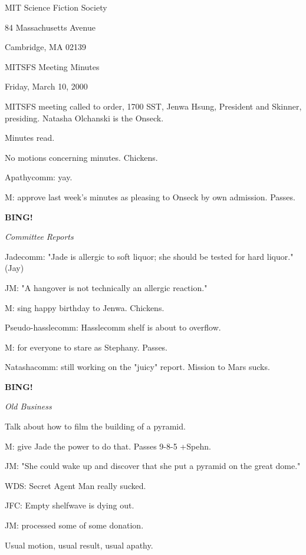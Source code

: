 \documentclass[12pt]{article}
\newcommand{\bing}{{\bf BING!} }
\newcommand{\goto}[1]{\bing \vskip 12pt \centerline{{\em{#1}}}}
\begin{document}
\begin{center}

MIT Science Fiction Society 

84 Massachusetts Avenue

Cambridge, MA 02139

\vspace{12pt}

MITSFS Meeting Minutes 

Friday, March 10, 2000

\end{center}
 
\vspace{18pt}

\setlength{\parskip}{6pt}

\noindent
MITSFS meeting called to order, 1700 SST, Jenwa Hsung, President and
Skinner, presiding.  Natasha Olchanski is the Onseck.

Minutes read.

No motions concerning minutes. Chickens.

Apathycomm: yay.

M: approve last week's minutes as pleasing to Onseck by own admission. Passes.

\goto{Committee Reports}

Jadecomm: "Jade is allergic to soft liquor; she should be tested for hard liquor." (Jay)

JM: "A hangover is not technically an allergic reaction."

M: sing happy birthday to Jenwa. Chickens.

Pseudo-hasslecomm: Hasslecomm shelf is about to overflow.

M: for everyone to stare as Stephany. Passes.

Natashacomm: still working on the "juicy" report. Mission to Mars sucks.

\goto{Old Business}

Talk about how to film the building of a pyramid.

M: give Jade the power to do that. Passes 9-8-5 +Spehn.

JM: "She could wake up and discover that she put a pyramid on the great dome."

WDS: Secret Agent Man really sucked.

JFC: Empty shelfwave is dying out.

JM: processed some of some donation.

Usual motion, usual result, usual apathy.
\end{document}
